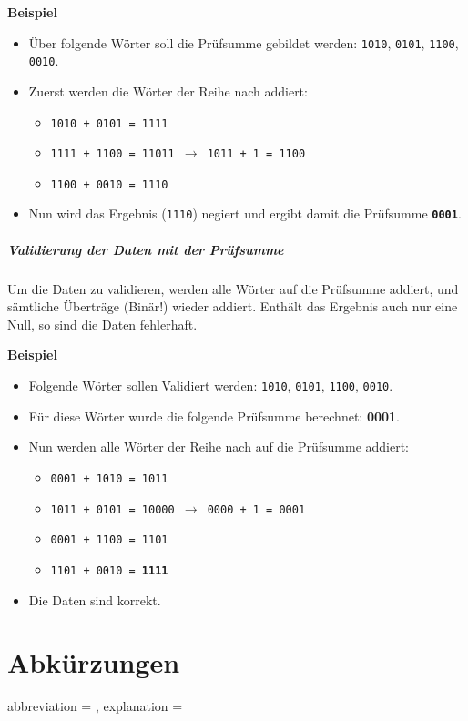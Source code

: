 \documentclass[a4paper, 11pt, accentcolor = tud3b]{tudreport}
\begin{document}
				\textbf{Beispiel}
				\begin{itemize}
					\item Über folgende Wörter soll die Prüfsumme gebildet werden: \texttt{1010}, \texttt{0101}, \texttt{1100}, \texttt{0010}.
					\item Zuerst werden die Wörter der Reihe nach addiert:
						\begin{itemize}
							\item \texttt{1010 + 0101 = 1111}
							\item \texttt{1111 + 1100 = 11011 \(\rightarrow\) 1011 + 1 = 1100}
							\item \texttt{1100 + 0010 = 1110}
						\end{itemize}
					\item Nun wird das Ergebnis (\texttt{1110}) negiert und ergibt damit die Prüfsumme \textbf{\texttt{0001}}.
				\end{itemize}
			
			\paragraph{Validierung der Daten mit der Prüfsumme}
				Um die Daten zu validieren, werden alle Wörter auf die Prüfsumme addiert, und sämtliche Überträge (Binär!) wieder addiert. Enthält das Ergebnis auch nur eine Null, so sind die Daten fehlerhaft.
				
				\textbf{Beispiel}
				\begin{itemize}
					\item Folgende Wörter sollen Validiert werden: \texttt{1010}, \texttt{0101}, \texttt{1100}, \texttt{0010}.
					\item Für diese Wörter wurde die folgende Prüfsumme berechnet: \textbf{0001}.
					\item Nun werden alle Wörter der Reihe nach auf die Prüfsumme addiert:
						\begin{itemize}
							\item \texttt{0001 + 1010 = 1011}
							\item \texttt{1011 + 0101 = 10000 \(\rightarrow\) 0000 + 1 = 0001}
							\item \texttt{0001 + 1100 = 1101}
							\item \texttt{1101 + 0010 = \textbf{1111}}
						\end{itemize}
					\item Die Daten sind korrekt.
				\end{itemize}

    \chapter{Abkürzungen}
        \begin{description}
                {abbreviation = \abbreviation, explanation = \explanation}%
                {\item[\abbreviation] \explanation}
        \end{description}
\end{document}

